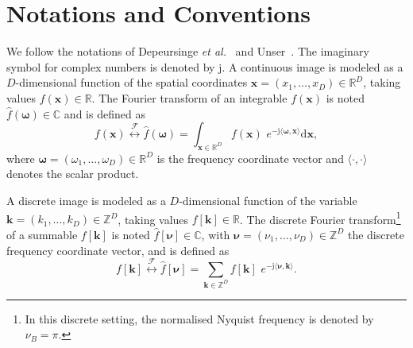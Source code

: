 \documentclass[fleqn,a4paper,oneside,openany]{book}
\begin{document}
\section{Notations and Conventions}\label{sec:notations}
%
We follow the notations of Depeursinge \textit{et al.}~\cite{DFA2017} and Unser~\cite{Uns2012}.
The imaginary symbol for complex numbers is denoted by $\mathrm{j}$.
A continuous image is modeled as a $D$-dimensional function of the spatial coordinates $\boldsymbol{x} = (x_1, \dots , x_D) \in \mathbb{R}^D$, taking values $f(\boldsymbol{x}) \in \mathbb{R}$. 
The Fourier transform of an integrable $f(\boldsymbol{x})$ is noted $\hat{f}(\boldsymbol{\omega})\in\mathbb{C}$ and is defined as
\begin{equation}\label{eq:continuousFourierTransform}
f(\boldsymbol{x})\overset{\mathcal{F}}{\longleftrightarrow}\hat{f}(\boldsymbol{\omega})=
\int_{\boldsymbol{x}\in\mathbb{R}^D} f(\boldsymbol{x}) \,\, e^{-\mathrm{j}\langle\boldsymbol{\omega},\boldsymbol{x}\rangle} \mathrm{d}\boldsymbol{x},
\end{equation}
where $\boldsymbol{\omega}=(\omega_1,\dots,\omega_D) \in \mathbb{R}^D$ is the frequency coordinate vector and $\langle\cdot,\cdot\rangle$ denotes the scalar product.

A discrete image is modeled as a $D$-dimensional function of the variable $\boldsymbol{k} = (k_1, \dots , k_D) \in \mathbb{Z}^D$, taking values $f[\boldsymbol{k}] \in \mathbb{R}$. 
The discrete Fourier transform\footnote{In this discrete setting, the normalised Nyquist frequency is denoted by $\nu_B=\pi$.} of a summable $f[\boldsymbol{k}]$ is noted $\hat{f}[\boldsymbol{\nu}]\in\mathbb{C}$, with $\boldsymbol{\nu}=(\nu_1,\dots,\nu_D) \in \mathbb{Z}^D$ the discrete frequency coordinate vector, and is defined as
\begin{equation}\label{eq:discreteFourierTransform}
f[\boldsymbol{k}]\overset{\mathcal{F}}{\longleftrightarrow}\hat{f}[\boldsymbol{\nu}]=
\sum_{\boldsymbol{k}\in\mathbb{Z}^D} f[\boldsymbol{k}] \,\, e^{-\mathrm{j}\langle\boldsymbol{\nu},\boldsymbol{k}\rangle}.
\end{equation}
\end{document}
